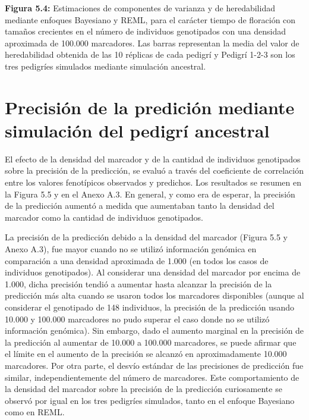 \documentclass[11pt,spanish,a4paper,oneside,]{book} %
\begin{document}
\noindent
\textbf{Figura 5.4:} Estimaciones de componentes de varianza y de heredabilidad mediante enfoques Bayesiano y REML, para el carácter tiempo de floración con tamaños crecientes en el número de individuos genotipados con una densidad aproximada de 100.000 marcadores. Las barras representan la media del valor de heredabilidad obtenida de las 10 réplicas de cada pedigrí y Pedigrí 1-2-3 son los tres pedigríes simulados mediante simulación ancestral.

\hypertarget{precisiuxf3n-de-la-prediciuxf3n-mediante-simulaciuxf3n-del-pedigruxed-ancestral-1}{%
\section{Precisión de la predición mediante simulación del pedigrí ancestral}\label{precisiuxf3n-de-la-prediciuxf3n-mediante-simulaciuxf3n-del-pedigruxed-ancestral-1}}

El efecto de la densidad del marcador y de la cantidad de individuos genotipados sobre la precisión de la predicción, se evaluó a través del coeficiente de correlación entre los valores fenotípicos observados y predichos. Los resultados se resumen en la Figura 5.5 y en el Anexo A.3. En general, y como era de esperar, la precisión de la predicción aumentó a medida que aumentaban tanto la densidad del marcador como la cantidad de individuos genotipados.

La precisión de la predicción debido a la densidad del marcador (Figura 5.5 y Anexo A.3), fue mayor cuando no se utilizó información genómica en comparación a una densidad aproximada de 1.000 (en todos los casos de individuos genotipados). Al considerar una densidad del marcador por encima de 1.000, dicha precisión tendió a aumentar hasta alcanzar la precisión de la predicción más alta cuando se usaron todos los marcadores disponibles (aunque al considerar el genotipado de 148 individuos, la precisión de la predicción usando 10.000 y 100.000 marcadores no pudo superar el caso donde no se utilizó información genómica). Sin embargo, dado el aumento marginal en la precisión de la predicción al aumentar de 10.000 a 100.000 marcadores, se puede afirmar que el límite en el aumento de la precisión se alcanzó en aproximadamente 10.000 marcadores. Por otra parte, el desvío estándar de las precisiones de predicción fue similar, independientemente del número de marcadores. Este comportamiento de la densidad del marcador sobre la precisión de la predicción curiosamente se observó por igual en los tres pedigríes simulados, tanto en el enfoque Bayesiano como en REML.
\end{document}
